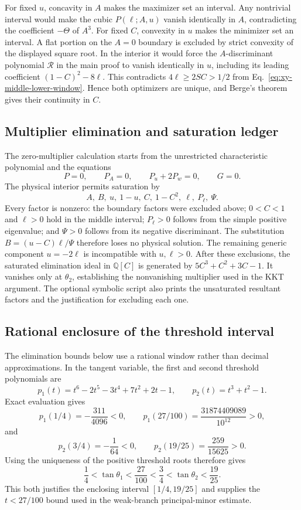 \documentclass[11pt,a4paper]{article}
\theoremstyle{remark}
\begin{document}
For fixed $u$, concavity in $A$ makes the maximizer set an interval.  Any
nontrivial interval would make the cubic
$P(\ell;A,u)$ vanish identically in $A$, contradicting the coefficient
$-\Theta$ of $A^3$.  For fixed $C$, convexity in $u$ makes the minimizer set
an interval.  A flat portion on the $A=0$ boundary is excluded by strict
convexity of the displayed square root.  In the interior it would force the
$A$-discriminant polynomial $\mathcal R$ in the main proof to vanish identically in
$u$, including its leading coefficient $(1-C)^2-8\ell$.  This contradicts
$4\ell\geq2SC>1/2$ from
Eq.~\eqref{eq:xy-middle-lower-window}.  Hence both optimizers are unique, and
Berge's theorem~\cite{berge1963} gives their continuity in $C$.

\subsection{Multiplier elimination and saturation ledger}

The zero-multiplier calculation starts from the unrestricted characteristic
polynomial and the equations
\[
 P=0,\qquad P_A=0,\qquad P_u+2P_w=0,\qquad G=0.
\]
The physical interior permits saturation by
\[
 A,\ B,\ u,\ 1-u,\ C,\ 1-C^2,\ \ell,\ P_\ell,\ \Psi.
\]
Every factor is nonzero: the boundary factors were excluded above;
$0<C<1$ and $\ell>0$ hold in the middle interval;
$P_\ell>0$ follows from the simple positive eigenvalue; and
$\Psi>0$ follows from its negative discriminant.  The substitution
$B=(u-C)\ell/\Psi$ therefore loses no physical solution.  The remaining
generic component $u=-2\ell$ is incompatible with $u,\ell>0$.
After these exclusions, the saturated elimination ideal in
$\mathbb{Q}[C]$ is generated by $5C^3+C^2+3C-1$.  It vanishes only at
$\theta_2$, establishing the nonvanishing multiplier used in the KKT
argument.  The optional symbolic script also prints the unsaturated resultant
factors and the justification for excluding each one.

\subsection{Rational enclosure of the threshold interval}

The elimination bounds below use a rational window rather than decimal
approximations.  In the tangent variable, the first and second threshold
polynomials are
\[
 p_1(t)=t^6-2t^5-3t^4+7t^2+2t-1,\qquad
 p_2(t)=t^3+t^2-1.
\]
Exact evaluation gives
\[
 p_1(1/4)=-\frac{311}{4096}<0,\qquad
 p_1(27/100)=\frac{31874409089}{10^{12}}>0,
\]
and
\[
 p_2(3/4)=-\frac1{64}<0,\qquad
 p_2(19/25)=\frac{259}{15625}>0.
\]
Using the uniqueness of the positive threshold roots therefore gives
\[
 \frac14<\tan\theta_1<\frac{27}{100}
 <\frac34<\tan\theta_2<\frac{19}{25}.
\]
This both justifies the enclosing interval $[1/4,19/25]$ and supplies the
$t<27/100$ bound used in the weak-branch principal-minor estimate.
\end{document}
